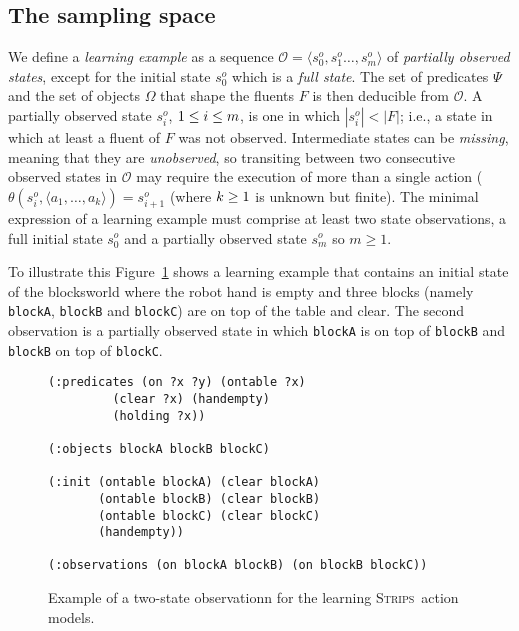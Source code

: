 \documentclass{article}
\newcommand{\tup}[1]{{\langle #1 \rangle}}
\newcommand{\strips}{\textsc{Strips}}
\begin{document}
\subsection{The sampling space}
We define a {\em learning example} as a sequence $\mathcal{O}=\tup{s_0^o,s_1^o \ldots, s_m^o}$ of {\em partially observed states}, except for the initial state $s_0^o$ which is a {\em full state}. The set of predicates $\Psi$ and the set of objects $\Omega$ that shape the fluents $F$ is then deducible from $\mathcal{O}$. A partially observed state $s_i^o$, ${\small 1\leq i\leq m}$, is one in which $|s_i^o| < |F|$; i.e., a state in which at least a fluent of $F$ was not observed. Intermediate states can be {\em missing}, meaning that they are {\em unobserved}, so transiting between two consecutive observed states in $\mathcal{O}$ may require the execution of more than a single action ($\theta(s_i^o,\tup{a_1,\ldots,a_k})=s_{i+1}^o$ (where ${\small k\geq 1}$ is unknown but finite). The minimal expression of a learning example must comprise at least two state observations, a full initial state $s_0^o$ and a partially observed state $s_m^o$ so $m \geq 1$.

To illustrate this Figure~\ref{fig:observation} shows a learning example that contains an initial state of the blocksworld where the robot hand is empty and three blocks (namely {\small\tt blockA}, {\small\tt blockB} and {\small\tt blockC}) are on top of the table and clear. The second observation is a partially observed state in which {\tt blockA} is on top of {\tt blockB} and {\tt blockB} on top of {\tt blockC}.
\begin{figure}[hbt!]
  \begin{tiny}
  \begin{verbatim}
(:predicates (on ?x ?y) (ontable ?x)
	     (clear ?x) (handempty)
	     (holding ?x))

(:objects blockA blockB blockC)

(:init (ontable blockA) (clear blockA)
       (ontable blockB) (clear blockB)
       (ontable blockC) (clear blockC)
       (handempty))

(:observations (on blockA blockB) (on blockB blockC))
  \end{verbatim}
  \end{tiny}
	\caption{\small Example of a two-state observationn for the learning \strips\ action models.}
	\label{fig:observation}
\end{figure}
\end{document}
